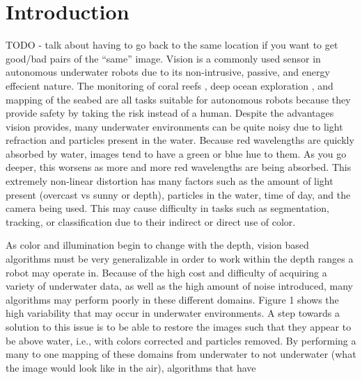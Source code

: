 \documentclass[conference,reqno]{IEEEtran}
\begin{document}
\IEEEpeerreviewmaketitle

\section{Introduction}
TODO - talk about having to go back to the same location if you want to get good/bad pairs of the ``same'' image.
Vision is a commonly used sensor in autonomous underwater robots due to its non-intrusive, passive, and energy
effecient nature. The monitoring of coral reefs \cite{shkurti2012multi}, deep ocean exploration
\cite{whitcomb2000advances}, and mapping of the seabed are all tasks suitable for autonomous robots because they
provide safety by taking the risk instead of a human. Despite the advantages vision provides, many underwater
environments can be quite noisy due to light refraction and particles present in the water. Because red wavelengths are
quickly absorbed by water, images tend to have a green or blue hue to them. As you go deeper, this worsens as more
and more red wavelengths are being absorbed. This extremely non-linear distortion has many factors such as the amount
of light present (overcast vs sunny or depth), particles in the water, time of day, and the camera being used. This may
cause difficulty in tasks such as segmentation, tracking, or classification due to their indirect or direct use of
color.

As color and illumination begin to change with the depth, vision based algorithms must be very generalizable in order
to work within the depth ranges a robot may operate in. Because of the high cost and difficulty of acquiring a
variety of underwater data, as well as the high amount of noise introduced, many algorithms may perform poorly in
these different domains. Figure 1 shows the high variability that may occur in underwater environments. A step towards a
solution to this
issue is to be able to restore the images such that they appear to be above water, i.e., with colors corrected and
particles removed. By performing a many to one mapping of these domains from underwater to not underwater (what the
image would look like in the air), algorithms that have
\end{document}
